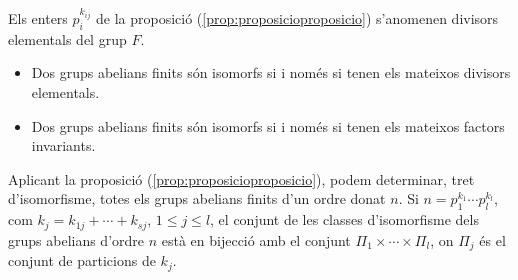 \documentclass[../main.tex]{subfiles}
\begin{document}
\begin{defi}
Els enters $p_i^{k_{ij}}$ de la proposició (\ref{prop:proposicioproposicio}) s'anomenen divisors elementals del grup $F$. 
\end{defi}

\begin{coro}
\begin{itemize}
    \item Dos grups abelians finits són isomorfs si i només si tenen els mateixos divisors elementals.
    \item Dos grups abelians finits són isomorfs si i només si tenen els mateixos factors invariants.
\end{itemize}
\end{coro}

Aplicant la proposició (\ref{prop:proposicioproposicio}), podem determinar, tret d'isomorfisme, totes els grups abelians finits d'un ordre donat $n$. Si $n = p_1^{k_1}\cdots p_l^{k_l}$, com $k_j = k_{1j}+\cdots+k_{sj}$, $1\leq j\leq l$, el conjunt de les classes d'isomorfisme dels grups abelians d'ordre $n$ està en bijecció amb el conjunt $\Pi_1\times\cdots \times \Pi_l$, on $\Pi_j$ és el conjunt de particions de $k_j$.
\end{document}

